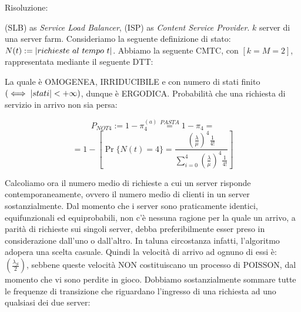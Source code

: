 Risoluzione:

(SLB) as \textit{Service Load Balancer}, (ISP) as \textit{Content Service Provider}. $k$ server di una server farm. Consideriamo la seguente definizione di stato: $N(t):=\cardinality{richieste\ al\ tempo\ t}$. Abbiamo la seguente CMTC, con $[k=M=2]$, rappresentata mediante il seguente DTT:

\begin{center}
\end{center}

La quale è OMOGENEA, IRRIDUCIBILE e con numero di stati finito $(\iff \left\vert{stati}\right\vert<+\infty)$, dunque è ERGODICA. Probabilità che una richiesta di servizio in arrivo non sia persa:

\[
	P_{NOT4} := 1-\pi_4^{(a)} \stackrel{PASTA}{=} 1-\pi_4 =
\]
\[
	= 1-[\Pr\{N(t)=4\} = \frac{(\frac{\lambda}{\mu})^4 \frac{1}{4!}}{\sum_{i=0}^4{(\frac{\lambda}{\mu})^4 \frac{1}{4!}}}]
\]

Calcoliamo ora il numero medio di richieste a cui un server risponde 
contemporaneamente, ovvero il numero medio di clienti in un server sostanzialmente. Dal momento che i server sono praticamente identici, equifunzionali ed equiprobabili, non c'è nessuna ragione per la quale un arrivo, a parità di richieste sui singoli server, debba preferibilmente esser preso in considerazione dall'uno o dall'altro. In taluna circostanza infatti, l'algoritmo adopera una scelta casuale. Quindi la velocità di arrivo ad ognuno di essi è: $(\frac{\lambda_S}{2})$, sebbene queste velocità NON costituiscano un processo di POISSON, dal momento che vi sono perdite in gioco. Dobbiamo sostanzialmente sommare tutte le frequenze di transizione che riguardano l'ingresso di una richiesta ad uno qualsiasi dei due server:

